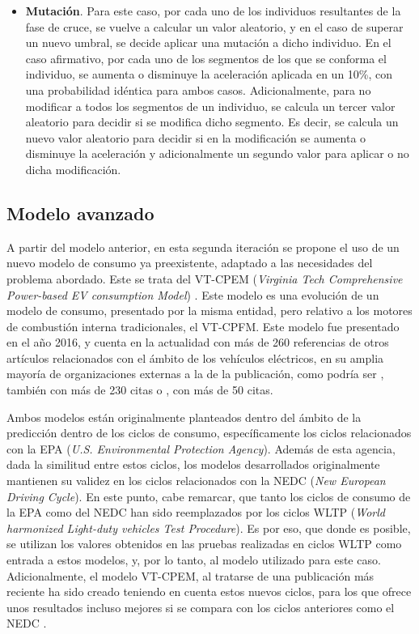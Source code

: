\documentclass[11pt,spanish,listoffigures,listoftables]{tfgetsinf}
\begin{document}
\begin{itemize}
    \item \textbf{Mutación}. Para este caso, por cada uno de los individuos resultantes de la fase de cruce, se vuelve a calcular un valor aleatorio, y en el caso de superar un nuevo umbral, se decide aplicar una mutación a dicho individuo. En el caso afirmativo, por cada uno de los segmentos de los que se conforma el individuo, se aumenta o disminuye la aceleración aplicada en un 10\%, con una probabilidad idéntica para ambos casos. Adicionalmente, para no modificar a todos los segmentos de un individuo, se calcula un tercer valor aleatorio para decidir si se modifica dicho segmento. Es decir, se calcula un nuevo valor aleatorio para decidir si en la modificación se aumenta o disminuye la aceleración y adicionalmente un segundo valor para aplicar o no dicha modificación.
\end{itemize}
\newpage

\subsection{Modelo avanzado}
A partir del modelo anterior, en esta segunda iteración se propone el uso de un nuevo modelo de consumo ya preexistente, adaptado a las necesidades del problema abordado. Este se trata del VT-CPEM (\textit{Virginia Tech Comprehensive Power-based EV consumption Model}) \cite{FIORI2016257}. Este modelo es una evolución de un modelo de consumo, presentado por la misma entidad, pero relativo a los motores de combustión interna tradicionales, el VT-CPFM. Este modelo fue presentado en el año 2016, y cuenta en la actualidad con más de 260 referencias de otros artículos relacionados con el ámbito de los vehículos eléctricos, en su amplia mayoría de organizaciones externas a la de la publicación, como podría ser \cite{ZENG2019}, también con más de 230 citas o \cite{YUAN2017}, con más de 50 citas.

Ambos modelos están originalmente planteados dentro del ámbito de la predicción dentro de los ciclos de consumo, específicamente los ciclos relacionados con la EPA (\textit{U.S. Environmental Protection Agency}). Además de esta agencia, dada la similitud entre estos ciclos, los modelos desarrollados originalmente mantienen su validez en los ciclos relacionados con la NEDC (\textit{New European Driving Cycle}). En este punto, cabe remarcar, que tanto los ciclos de consumo de la EPA como del NEDC han sido reemplazados por los ciclos WLTP (\textit{World harmonized Light-duty vehicles Test Procedure}). Es por eso, que donde es posible, se utilizan los valores obtenidos en las pruebas realizadas en ciclos WLTP como entrada a estos modelos, y, por lo tanto, al modelo utilizado para este caso. Adicionalmente, el modelo VT-CPEM, al tratarse de una publicación más reciente ha sido creado teniendo en cuenta estos nuevos ciclos, para los que ofrece unos resultados incluso mejores si se compara con los ciclos anteriores como el NEDC \cite{FIORI2016257}.
\end{document}
